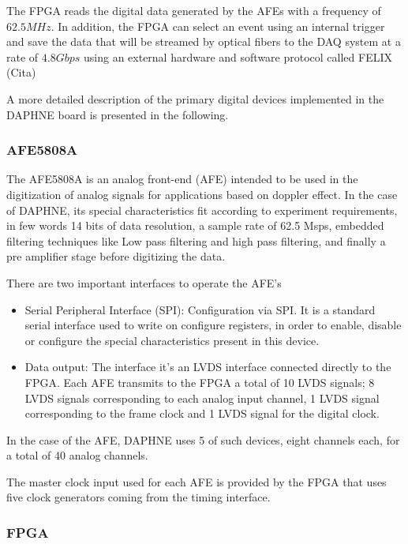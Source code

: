 The FPGA reads the digital data generated by the AFEs with a frequency of $62.5MHz$. In addition, the FPGA can select an event using an internal trigger and save the data that will be streamed by optical fibers to the DAQ system at a rate of $4.8Gbps$ using an external hardware and software protocol called FELIX (Cita) 


A more detailed description of the primary digital devices implemented in the DAPHNE board is presented in the following.

\subsubsection{AFE5808A}

The AFE5808A is an analog front-end (AFE) intended to be used in the digitization of analog signals \cite{afe5808a} for applications based on doppler effect. In the case of DAPHNE, its special characteristics fit according to experiment requirements, in few words 14 bits of data resolution, a sample rate of 62.5 Msps, embedded filtering techniques like Low pass filtering and high pass filtering, and finally a pre amplifier stage before digitizing the data.

There are two important interfaces to operate the AFE's

\begin{itemize}
\item Serial Peripheral Interface (SPI): Configuration via SPI. It is a standard serial interface used to write on configure registers, in order to enable, disable or configure the special characteristics present in this device. 

\item Data output: The interface it's an LVDS interface connected directly to the FPGA. Each AFE transmits to the FPGA a total of 10 LVDS signals; 8 LVDS signals corresponding to each analog input channel, 1 LVDS signal corresponding to the frame clock and 1 LVDS signal for the digital clock.
\end{itemize}

In the case of the AFE, DAPHNE uses 5 of such devices, eight channels each, for a total of 40 analog channels. 

The master clock input used for each AFE is provided by the FPGA that uses five clock generators coming from the timing interface.

\subsubsection{FPGA}

